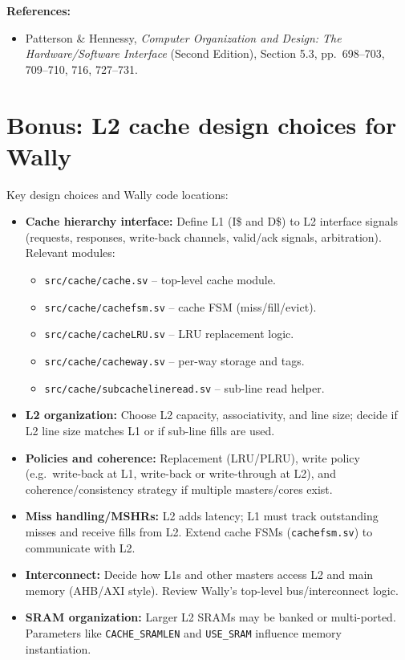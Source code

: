 \documentclass[11pt]{article}
\begin{document}
\textbf{References:}
\begin{itemize}
  \item Patterson \& Hennessy, \emph{Computer Organization and Design: The Hardware/Software Interface} (Second Edition), Section 5.3, pp.~698--703, 709--710, 716, 727--731.
\end{itemize}

\section*{Bonus: L2 cache design choices for Wally}

Key design choices and Wally code locations:

\begin{itemize}
  \item \textbf{Cache hierarchy interface:} Define L1 (I\$ and D\$) to L2 interface signals (requests, responses, write-back channels, valid/ack signals, arbitration).
        Relevant modules:
        \begin{itemize}
          \item \texttt{src/cache/cache.sv} -- top-level cache module.
          \item \texttt{src/cache/cachefsm.sv} -- cache FSM (miss/fill/evict).
          \item \texttt{src/cache/cacheLRU.sv} -- LRU replacement logic.
          \item \texttt{src/cache/cacheway.sv} -- per-way storage and tags.
          \item \texttt{src/cache/subcachelineread.sv} -- sub-line read helper.
        \end{itemize}
  \item \textbf{L2 organization:} Choose L2 capacity, associativity, and line size; decide if L2 line size matches L1 or if sub-line fills are used.
  \item \textbf{Policies and coherence:} Replacement (LRU/PLRU), write policy (e.g.\ write-back at L1, write-back or write-through at L2), and coherence/consistency strategy if multiple masters/cores exist.
  \item \textbf{Miss handling/MSHRs:} L2 adds latency; L1 must track outstanding misses and receive fills from L2. Extend cache FSMs (\texttt{cachefsm.sv}) to communicate with L2.
  \item \textbf{Interconnect:} Decide how L1s and other masters access L2 and main memory (AHB/AXI style). Review Wally's top-level bus/interconnect logic.
  \item \textbf{SRAM organization:} Larger L2 SRAMs may be banked or multi-ported. Parameters like \texttt{CACHE\_SRAMLEN} and \texttt{USE\_SRAM} influence memory instantiation.

\end{itemize}
\end{document}
